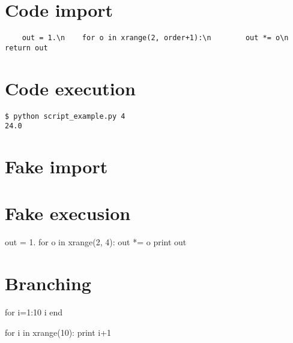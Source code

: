 \documentclass{article}
\begin{document}
\section*{Code import}

\begin{Verbatim}
    out = 1.\n    for o in xrange(2, order+1):\n        out *= o\n    return out
\end{Verbatim}

\section*{Code execution}

\begin{Verbatim}
$ python script_example.py 4
24.0
\end{Verbatim}


\section*{Fake import}



\section*{Fake execusion}

out = 1.
for o in xrange(2, 4):
    out *= o
print out

\section*{Branching}

for i=1:10
    i
end

for i in xrange(10):
    print i+1
\end{document}
